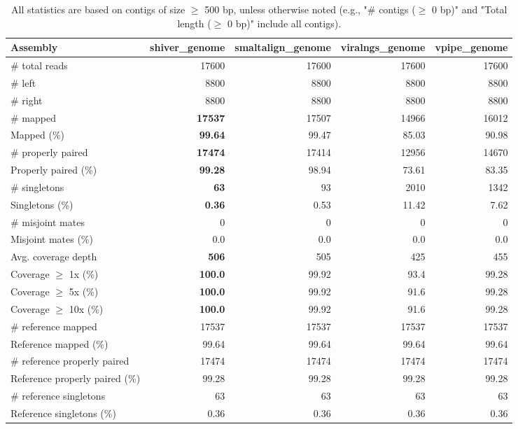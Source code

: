 \documentclass[12pt,a4paper]{article}
\begin{document}
\begin{table}[ht]
\begin{center}
\caption{All statistics are based on contigs of size $\geq$ 500 bp, unless otherwise noted (e.g., "\# contigs ($\geq$ 0 bp)" and "Total length ($\geq$ 0 bp)" include all contigs).}
\begin{tabular}{|l*{4}{|r}|}
\hline
Assembly & shiver\_genome & smaltalign\_genome & viralngs\_genome & vpipe\_genome \\ \hline
\# total reads & 17600 & 17600 & 17600 & 17600 \\ \hline
\# left & 8800 & 8800 & 8800 & 8800 \\ \hline
\# right & 8800 & 8800 & 8800 & 8800 \\ \hline
\# mapped & {\bf 17537} & 17507 & 14966 & 16012 \\ \hline
Mapped (\%) & {\bf 99.64} & 99.47 & 85.03 & 90.98 \\ \hline
\# properly paired & {\bf 17474} & 17414 & 12956 & 14670 \\ \hline
Properly paired (\%) & {\bf 99.28} & 98.94 & 73.61 & 83.35 \\ \hline
\# singletons & {\bf 63} & 93 & 2010 & 1342 \\ \hline
Singletons (\%) & {\bf 0.36} & 0.53 & 11.42 & 7.62 \\ \hline
\# misjoint mates & 0 & 0 & 0 & 0 \\ \hline
Misjoint mates (\%) & 0.0 & 0.0 & 0.0 & 0.0 \\ \hline
Avg. coverage depth & {\bf 506} & 505 & 425 & 455 \\ \hline
Coverage $\geq$ 1x (\%) & {\bf 100.0} & 99.92 & 93.4 & 99.28 \\ \hline
Coverage $\geq$ 5x (\%) & {\bf 100.0} & 99.92 & 91.6 & 99.28 \\ \hline
Coverage $\geq$ 10x (\%) & {\bf 100.0} & 99.92 & 91.6 & 99.28 \\ \hline
\# reference mapped & 17537 & 17537 & 17537 & 17537 \\ \hline
Reference mapped (\%) & 99.64 & 99.64 & 99.64 & 99.64 \\ \hline
\# reference properly paired & 17474 & 17474 & 17474 & 17474 \\ \hline
Reference properly paired (\%) & 99.28 & 99.28 & 99.28 & 99.28 \\ \hline
\# reference singletons & 63 & 63 & 63 & 63 \\ \hline
Reference singletons (\%) & 0.36 & 0.36 & 0.36 & 0.36 \\ \hline

\end{tabular}
\end{center}
\end{table}
\end{document}
